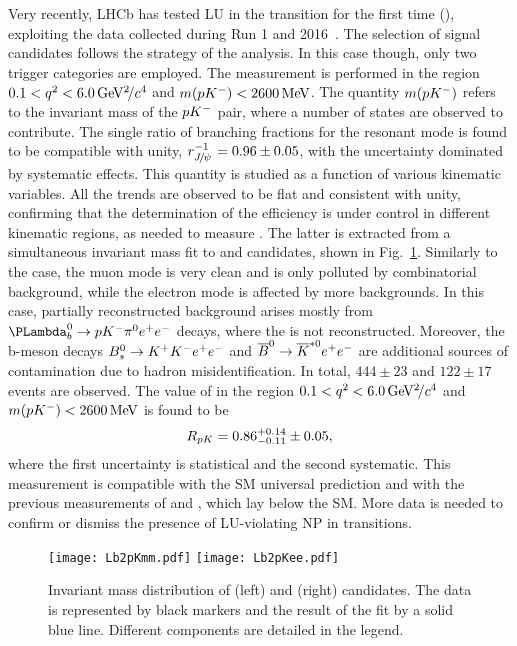 \documentclass[a4paper,11pt]{article}
\begin{document}
Very recently, LHCb has tested LU in the transition \LbTopKll for the first time (\RpK), exploiting the data collected during Run 1 and 2016~\cite{RpK}. 
The selection of signal candidates follows the strategy of the \RK analysis. In this case though, only two trigger categories are employed.
The measurement is performed in the region $0.1 < q^2 < 6.0 {\mathrm{\,Ge\kern -0.1em V^2\!/}c^4}$ and $m(p{{{K}}^-}) < 2600 \mathrm{\,Me\kern -0.1em V}$.
The quantity $m(p{{{K}}^-})$ refers to the invariant mass of the $p{{{K}}^-}$ pair, where a number of states are observed to contribute.
The single ratio of branching fractions for the resonant mode is found to be compatible with unity, $r_{{{J}\mskip -3mu/\mskip -2mu\psi\mskip 2mu}}^{-1} = 0.96 \pm 0.05$, with the uncertainty dominated by systematic effects. 
This quantity is studied as a function of various kinematic variables. 
All the trends are observed to be flat and consistent with unity, confirming that the determination of the efficiency is under control in different kinematic regions, as needed to measure \RpK.
The latter is extracted from a simultaneous invariant mass fit to \LbTopKmm and \LbTopKee candidates, shown in Fig.~\ref{fig:RpK_fits}. 
Similarly to the \RK case, the muon mode is very clean and is only polluted by combinatorial background, while the electron mode is affected by more backgrounds. In this case, partially reconstructed background arises mostly from $\Lb \to p\Km\piz \epem$ decays, where the \piz is not reconstructed. Moreover, the b-meson decays ${{B}^0_{{s}}}\to{\ensuremath{{{K}}^+}}{\ensuremath{{{K}}^-}}{\ensuremath{{e}^+{e}^-}}$ and $\overline{{B}}^0 \to\overline{K}^{*0}{{e}^+{e}^-}$ are additional sources of contamination due to hadron misidentification. 
In total, $444 \pm 23$ \LbTopKmm and $122 \pm 17$ \LbTopKee events are observed. 
The value of \RpK in the region $0.1 < q^2 < 6.0 {\mathrm{\,Ge\kern -0.1em V^2\!/}c^4}$ and $m(p{{{K}}^-}) < 2600 \mathrm{\,Me\kern -0.1em V}$ is found to be
\begin{equation}
	R_{pK} = 0.86^{+0.14}_{-0.11} \pm 0.05,
\end{equation}
where the first uncertainty is statistical and the second systematic. 
This measurement is compatible with the SM universal prediction and with the previous measurements of \RK and \RKst, 
which lay below the SM. More data is needed to confirm or dismiss the presence of LU-violating NP in \bsll transitions.

\begin{figure}
	\centering
	\texttt{[image: Lb2pKmm.pdf]}
	\texttt{[image: Lb2pKee.pdf]}
	\caption{Invariant mass distribution of \LbTopKmm (left) and \LbTopKee (right) candidates. 
		The data is represented by black markers and the result of the fit by a solid blue line. Different components are detailed in the legend.}
	\label{fig:RpK_fits}
\end{figure}
\end{document}
